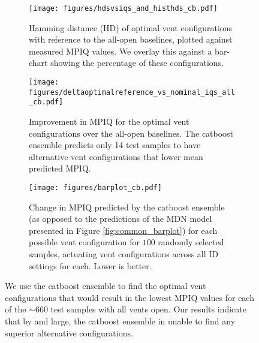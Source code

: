 \begin{figure*}
    \centering
    \begin{minipage}{.97\textwidth}
        \begin{subfigure}{0.49\textwidth}
            \centering
            \texttt{[image: figures/hdsvsiqs\_and\_histhds\_cb.pdf]}
            \caption{Hamming distance (HD) of optimal vent configurations with reference to the all-open baselines, plotted against measured MPIQ values. We overlay this against a bar-chart showing the percentage of these configurations.}
            \label{fig:hdsvsiqs_and_histhds_cb}
        \end{subfigure}
        \hfill
        \begin{subfigure}{0.49\textwidth}
            \centering
            \texttt{[image: figures/deltaoptimalreference\_vs\_nominal\_iqs\_all\_cb.pdf]}
            \caption{Improvement in MPIQ for the optimal vent configurations over the all-open baselines. The {\sc catboost} ensemble predicts only 14 test samples to have alternative vent configurations that lower mean predicted MPIQ.}
            \label{fig:deltaoptimalreference_vs_nominal_iqs_all_cb}
        \end{subfigure}
        \newline
        \begin{subfigure}{0.99\textwidth}
            \centering
            \texttt{[image: figures/barplot\_cb.pdf]}
            \caption{Change in MPIQ predicted by the {\sc catboost} ensemble (as opposed to the predictions of the MDN model presented in Figure \ref{fig:common_barplot}) for each possible vent configuration for $100$ randomly selected samples, actuating vent configurations across all ID settings for each. Lower is better.}%
            \label{fig:barplot_cb}
        \end{subfigure}
        \caption{We use the {\sc catboost} ensemble to find the optimal vent configurations that would result in the lowest MPIQ values for each of the $\sim660$ test samples with all vents open. Our results indicate that by and large, the {\sc catboost} ensemble in unable to find any superior alternative configurations.}
        \label{fig:cb_appendix}
    \end{minipage}


\end{figure*}
